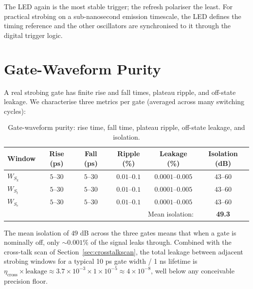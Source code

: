 \documentclass[twocolumn,11pt,a4paper]{article}
\theoremstyle{thmstyle}
\theoremstyle{axiomstyle}
\theoremstyle{definition}
\theoremstyle{remark}
\begin{document}
The LED again is the most stable trigger; the refresh polariser the least. For practical strobing on a sub-nanosecond emission timescale, the LED defines the timing reference and the other oscillators are synchronised to it through the digital trigger logic.

\section{Gate-Waveform Purity}
\label{sec:gatepurity}

A real strobing gate has finite rise and fall times, plateau ripple, and off-state leakage. We characterise three metrics per gate (averaged across many switching cycles):

\begin{table}[H]
\centering
\caption{Gate-waveform purity: rise time, fall time, plateau ripple, off-state leakage, and isolation.}
\label{tab:gatepurity}
\small
\begin{tabular}{lccccc}
\toprule
Window & Rise (ps) & Fall (ps) & Ripple (\%) & Leakage (\%) & Isolation (dB)\\
\midrule
$W_{S_{k}}$ & $5$--$30$ & $5$--$30$ & $0.01$--$0.1$ & $0.0001$--$0.005$ & $43$--$60$\\
$W_{S_{t}}$ & $5$--$30$ & $5$--$30$ & $0.01$--$0.1$ & $0.0001$--$0.005$ & $43$--$60$\\
$W_{S_{e}}$ & $5$--$30$ & $5$--$30$ & $0.01$--$0.1$ & $0.0001$--$0.005$ & $43$--$60$\\
\midrule
\multicolumn{5}{r}{Mean isolation:} & \textbf{49.3}\\
\bottomrule
\end{tabular}
\end{table}

The mean isolation of $49$ dB across the three gates means that when a gate is nominally off, only $\sim 0.001\%$ of the signal leaks through. Combined with the cross-talk scan of Section~\ref{sec:crosstalkscan}, the total leakage between adjacent strobing windows for a typical 10 ps gate width / 1 ns lifetime is $\eta_{\text{cross}} \times \text{leakage} \approx 3.7\times 10^{-3} \times 1\times 10^{-5} \approx 4\times 10^{-8}$, well below any conceivable precision floor.
\end{document}
